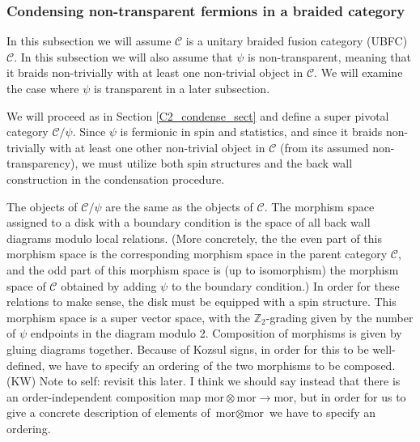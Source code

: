 \documentclass[12pt,a4paper]{article}
\newcommand{\tp}{\otimes}
\newcommand{\mcc}{\mathcal{C}}
\newcommand{\zt}{\mathbb{Z}_2}
\newcommand{\mor}{\text{mor}}
\newcommand{\kw}[1]{{\color{kwcolor}\footnotesize{(KW) #1}}}
\begin{document}
\subsubsection{Condensing non-transparent fermions in a braided category}  \label{gntf_condense}


In this subsection we will assume $\mcc$ is a unitary braided fusion category (UBFC) $\mathcal{C}$.
In this subsection we will also assume that $\psi$ is non-transparent, meaning that it braids non-trivially with at least one non-trivial object in $\mcc$. 
We will examine the case where $\psi$ is transparent in a later subsection. 


We will proceed 
as in Section \ref{C2_condense_sect} and define a super pivotal category $\mcc/\psi$. 
Since $\psi$ is fermionic in spin and statistics, and since it braids non-trivially with 
at least one other non-trivial object in $\mcc$ (from its assumed non-transparency), we
must utilize both spin structures and the back wall construction in the condensation 
procedure. 

The objects of $\mcc/\psi$ are the same as the objects of $\mcc$.
The morphism space assigned to a disk with a boundary condition is the space of all back wall diagrams
modulo local relations.
(More concretely, the the even part of this morphism space is the corresponding morphism space in the parent category $\mcc$,
and the odd part of this morphism space is (up to isomorphism) the morphism space of $\mcc$ 
obtained by adding $\psi$ to the boundary condition.)
In order for these relations to make sense, the disk must be equipped with a spin structure.
This morphism space is a super vector space, with the $\zt$-grading given by the number of $\psi$ endpoints in the diagram modulo 2.
Composition of morphisms is given by gluing diagrams together.
Because of Kozsul signs, in order for this to be well-defined, 
we have to specify an ordering of the two morphisms to be composed.
\kw{Note to self: revisit this later.
I think we should say instead that there is an order-independent composition map $\mor\tp\mor\to\mor$, but in order
for us to give a concrete description of elements of $\mor\tp\mor$ we have to specify an ordering.}
\end{document}
